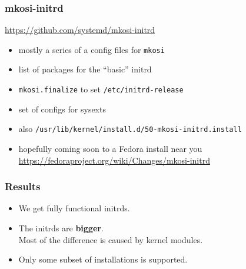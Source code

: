 \documentclass[]{beamer}
\newcommand\pp\pause
\begin{document}
\begin{frame}[fragile]
  \frametitle{mkosi-initrd}

  \url{https://github.com/systemd/mkosi-initrd}

  \quad

  \pp

  \begin{itemize}
  \item mostly a series of a config files for \texttt{mkosi}
    \pp
  \item list of packages for the ``basic'' initrd
    \pp
  \item \texttt{mkosi.finalize} to set \texttt{/etc/initrd-release}
    \pp
  \item set of configs for sysexts

  \quad

    \pp
  \item also \texttt{/usr/lib/kernel/install.d/50-mkosi-initrd.install}

  \quad

    \pp
  \item hopefully coming soon to a Fedora install near you\\
    \small{\url{https://fedoraproject.org/wiki/Changes/mkosi-initrd}}
    
  \end{itemize}
\end{frame}

\begin{frame}
  \frametitle{Results}

  \begin{itemize}
  \pp
  \item We get fully functional initrds.

  \pp
  \item The initrds are \textbf{bigger}.\\
  \pp
  Most of the difference is caused by kernel modules.

  \pp
  \item Only some subset of installations is supported.
  \end{itemize}
\end{frame}
\end{document}

